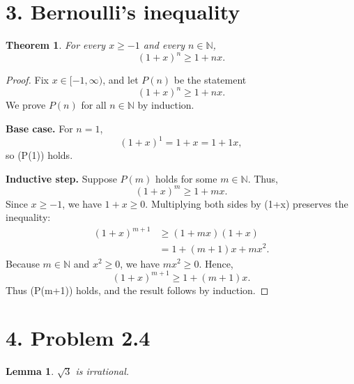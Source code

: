 \documentclass[11pt]{article}
\newtheorem{theorem}{Theorem}
\newtheorem{lemma}{Lemma}
\begin{document}
\section*{3. Bernoulli's inequality}

\begin{theorem}
For every \(x\geq -1\) and every \(n\in\mathbb{N}\),
\[
(1+x)^n\geq 1+nx.
\]
\end{theorem}

\begin{proof}
Fix \(x\in[-1,\infty)\), and let \(P(n)\) be the statement
\[
(1+x)^n\geq 1+nx.
\]
We prove \(P(n)\) for all \(n\in\mathbb{N}\) by induction.

\textbf{Base case.} For \(n=1\),
\[
(1+x)^1=1+x=1+1x,
\]
so (P(1)) holds.

\textbf{Inductive step.} Suppose \(P(m)\) holds for some \(m\in\mathbb{N}\).
Thus,
\[
(1+x)^m\geq 1+mx.
\]
Since \(x\geq -1\), we have \(1+x\geq 0\).
Multiplying both sides by (1+x) preserves the inequality:
\begin{align*}
(1+x)^{m+1}
&\geq(1+mx)(1+x)\\
&=1+(m+1)x+mx^2.
\end{align*}
Because \(m\in\mathbb{N}\) and \(x^2\geq 0\), we have \(mx^2\geq 0\).
Hence,
\[
(1+x)^{m+1}\geq 1+(m+1)x.
\]
Thus (P(m+1)) holds, and the result follows by induction.
\end{proof}

\section*{4. Problem 2.4}

\begin{lemma}\label{lem:sqrt-three}
\(\sqrt{3}\) is irrational.
\end{lemma}
\end{document}
